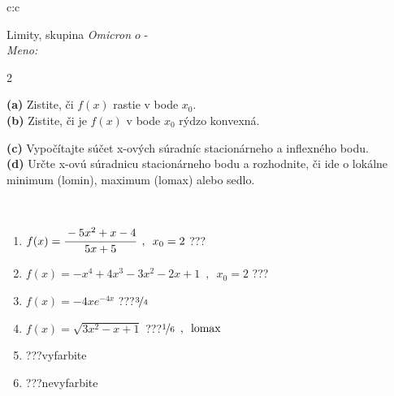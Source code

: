 \documentclass[10pt]{report}
\newcommand\omicron{o}
\begin{document}
\begin{tabular}{c:c}
\begin{minipage}[c][104.5mm][t]{0.5\linewidth}
\begin{center}
\vspace{7mm}
{\huge Limity, skupina \textit{Omicron $\omicron$} -}\\[5mm]
\textit{Meno:}\phantom{xxxxxxxxxxxxxxxxxxxxxxxxxxxxxxxxxxxxxxxxxxxxxxxxxxxxxxxxxxxxxxxxx}\\[5mm]
\begin{minipage}{0.95\linewidth}
\begin{center}
{\small \begin{multicols}{2} \raggedright
\textbf{(a)} Zistite, či \(f(x)\) rastie v bode \(x_0\). \\[1mm]
\textbf{(b)} Zistite, či je \(f(x)\) v bode \(x_0\) rýdzo konvexná. \par \columnbreak
\textbf{(c)} Vypočítajte súčet x-ových súradníc stacionárneho a inflexného bodu. \\[1mm]
\textbf{(d)} Určte x-ovú súradnicu stacionárneho bodu a rozhodnite, či ide o lokálne minimum (lomin), maximum (lomax) alebo sedlo. \\[1mm]
\end{multicols}
}
\end{center}
\end{minipage}
\\[4mm]
\begin{minipage}{0.79\linewidth}
\begin{center}
\begin{varwidth}{\linewidth}
\begin{enumerate}
\normalsize
\item $f(x)=\cfrac{-5x^2+x-4}{5x+5}\enspace , \enspace x_0=2$\quad \dotfill\; ???\;\dotfill \quad {}
\item $f(x)=-x^4+4x^3-3x^2-2x+1\enspace , \enspace x_0=2$\quad \dotfill\; ???\;\dotfill \quad {}
\item $f(x)=-4xe^{-4x}$\quad \dotfill\; ???\;\dotfill \quad $\nicefrac{3}{4}$
\item $f(x)=\sqrt{3x^2-x+1}$\quad \dotfill\; ???\;\dotfill \quad $\nicefrac{1}{6}\enspace , \enspace\text{lomax}$
\item \quad \dotfill\; ???\;\dotfill \quad vyfarbite
\item \quad \dotfill\; ???\;\dotfill \quad nevyfarbite
\end{enumerate}
\end{varwidth}

\end{center}
\end{minipage}
\end{center}
\end{minipage}
\end{tabular}
\end{document}
